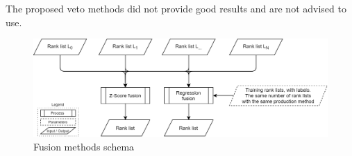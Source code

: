 The proposed veto methods did not provide good results and are not advised to use.

\begin{figure}
  \centering
  \caption{Fusion methods schema}
  \label{fig:schema-fusion}
  \includegraphics[width=1\linewidth]{img/schema-fusion.png}
\end{figure}

\begin{table}
  \caption{Fusion evaluation summary, mean across every corpora}
  \label{tab:fusion_evaluation_summary}
\end{table}
